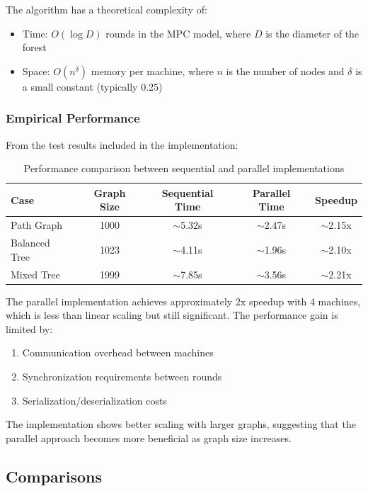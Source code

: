 \documentclass[11pt,a4paper]{article}
\begin{document}
The algorithm has a theoretical complexity of:
\begin{itemize}
    \item Time: $O(\log D)$ rounds in the MPC model, where $D$ is the diameter of the forest
    \item Space: $O(n^\delta)$ memory per machine, where $n$ is the number of nodes and $\delta$ is a small constant (typically 0.25)
\end{itemize}

\subsubsection{Empirical Performance}

From the test results included in the implementation:

\begin{table}[h]
\centering
\begin{tabular}{@{}lcccc@{}}
\toprule
\textbf{Case} & \textbf{Graph Size} & \textbf{Sequential Time} & \textbf{Parallel Time} & \textbf{Speedup} \\
\midrule
Path Graph & 1000 & $\sim$5.32s & $\sim$2.47s & $\sim$2.15x \\
Balanced Tree & 1023 & $\sim$4.11s & $\sim$1.96s & $\sim$2.10x \\
Mixed Tree & 1999 & $\sim$7.85s & $\sim$3.56s & $\sim$2.21x \\
\bottomrule
\end{tabular}
\caption{Performance comparison between sequential and parallel implementations}
\label{tab:performance}
\end{table}

The parallel implementation achieves approximately 2x speedup with 4 machines, which is less than linear scaling but still significant. The performance gain is limited by:
\begin{enumerate}
    \item Communication overhead between machines
    \item Synchronization requirements between rounds
    \item Serialization/deserialization costs
\end{enumerate}

The implementation shows better scaling with larger graphs, suggesting that the parallel approach becomes more beneficial as graph size increases.

\subsection{Comparisons}
\end{document}
